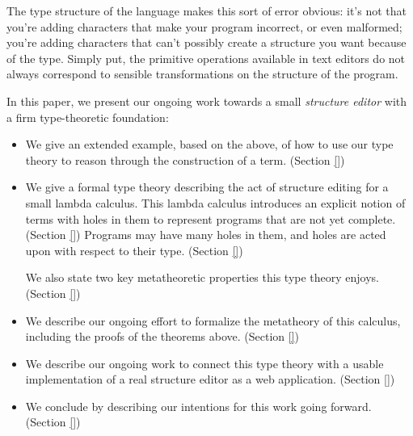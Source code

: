The type structure of the language makes this sort of error obvious: it's
not that you're adding characters that make your program incorrect, or even
malformed; you're adding characters that can't possibly create a structure
you want because of the type. Simply put, the primitive operations
available in text editors do not always correspond to sensible
transformations on the structure of the program.

In this paper, we present our ongoing work towards a small \emph{structure
  editor} with a firm type-theoretic foundation:
\begin{itemize}
  \item We give an extended example, based on the above, of how to use our
    type theory to reason through the construction of a term. (Section
    \ref{})

  \item We give a formal type theory describing the act of structure
    editing for a small lambda calculus. This lambda calculus introduces an
    explicit notion of terms with holes in them to represent programs that
    are not yet complete.  (Section \ref{}) Programs may have many holes in
    them, and holes are acted upon with respect to their type. (Section
    \ref{})

    We also state two key metatheoretic properties this type theory
    enjoys. (Section \ref{})

  \item We describe our ongoing effort to formalize the metatheory of this
    calculus, including the proofs of the theorems above. (Section \ref{})

  \item We describe our ongoing work to connect this type theory with a
    usable implementation of a real structure editor as a web
    application. (Section \ref{})

  \item We conclude by describing our intentions for this work going
    forward. (Section \ref{})
\end{itemize}








